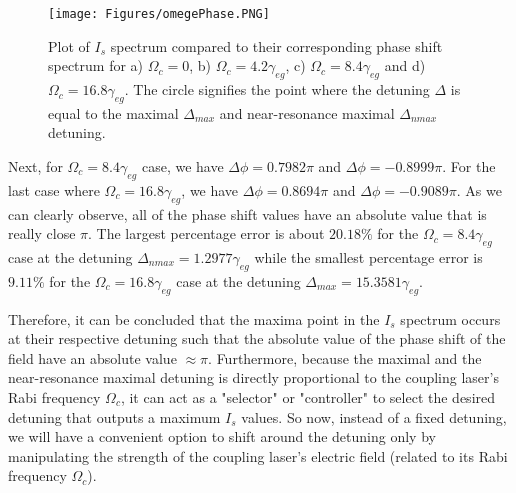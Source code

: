 \begin{figure}
    \centering
    \texttt{[image: Figures/omegePhase.PNG]}
    \caption{Plot of $I_{s}$ spectrum compared to their corresponding phase shift spectrum for a) $\Omega_{c} = 0$, b) $\Omega_{c} = 4.2\gamma_{eg}$, c) $\Omega_{c} = 8.4\gamma_{eg}$ and d) $\Omega_{c} = 16.8\gamma_{eg}$. The circle signifies the point where the detuning $\Delta$ is equal to the maximal $\Delta_{max}$ and near-resonance maximal $\Delta_{nmax}$ detuning.}
    \label{fig: omegaPhase}
\end{figure}

Next,  for $\Omega_{c} = 8.4\gamma_{eg}$ case, we have $\Delta\phi = 0.7982\pi$ and $\Delta\phi = -0.8999\pi$. For the last case where $\Omega_{c} = 16.8\gamma_{eg}$, we have $\Delta\phi = 0.8694\pi$ and $\Delta\phi = -0.9089\pi$. As we can clearly observe, all of the phase shift values have an absolute value that is really close $\pi$. The largest percentage error is about $20.18\%$ for the $\Omega_{c} = 8.4\gamma_{eg}$ case at the detuning $\Delta_{nmax} = 1.2977\gamma_{eg}$ while the smallest percentage error is $9.11\%$ for the $\Omega_{c} = 16.8\gamma_{eg}$ case at the detuning $\Delta_{max} = 15.3581\gamma_{eg}$.

Therefore, it can be concluded that the maxima point in the $I_{s}$ spectrum occurs at their respective detuning such that the absolute value of the phase shift of the field have an absolute value $\approx \pi$. Furthermore, because the maximal and the near-resonance maximal detuning is directly proportional to the coupling laser's Rabi frequency $\Omega_{c}$, it can act as a "selector" or "controller" to select the desired detuning that outputs a maximum $I_{s}$ values. So now, instead of a fixed detuning, we will have a convenient option to shift around the detuning only by manipulating the strength of the coupling laser's electric field (related to its Rabi frequency $\Omega_{c}$).
